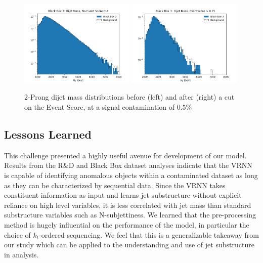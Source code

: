 \documentclass[letterpaper,11pt]{article}
\begin{document}
\begin{figure}[h!]
	\begin{center}
		\includegraphics[width=0.49\textwidth]{imgs/BB3.png}
		\includegraphics[width=0.49\textwidth]{imgs/BB3_Cut.png}
	\end{center}
	\caption{2-Prong dijet mass distributions before (left) and after (right) a cut on the Event Score, at a signal contamination of 0.5\%}
	\label{fig:bb3}
\end{figure}


\subsection{Lessons Learned}
\label{sec:lessons}


This challenge presented a highly useful avenue for development of our model. Results from the R\&D and Black Box dataset analyses indicate that the VRNN is capable of identifying anomalous objects within a contaminated dataset as long as they can be characterized by sequential data. 
Since the VRNN takes constituent information as input and learns jet substructure without explicit reliance on high level variables, it is less correlated with jet mass than standard substructure variables such as N-subjettiness. 
We learned that the pre-processing method is hugely influential on the performance of the model, in particular the choice of $k_{t}$-ordered sequencing. 
We feel that this is a generalizable takeaway from our study which can be applied to the understanding and use of jet substructure in analysis.
\end{document}
